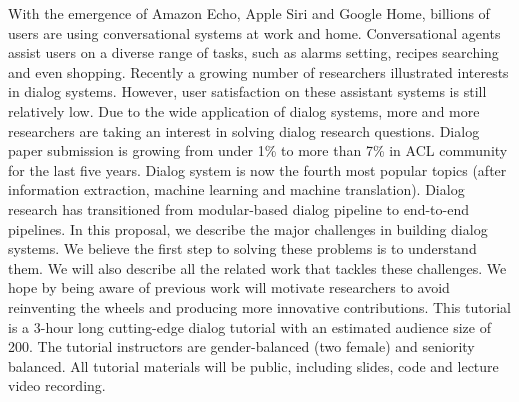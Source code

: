 With the emergence of Amazon Echo, Apple Siri and Google Home, billions of users are using conversational systems at work and home. Conversational agents assist users on a diverse range of tasks, such as alarms setting, recipes searching and even shopping. Recently a growing number of researchers illustrated interests in dialog systems. However, user satisfaction on these assistant systems is still relatively low. Due to the wide application of dialog systems, more and more researchers are taking an interest in solving dialog research questions. Dialog paper submission is growing from under 1\% to more than 7\% in ACL community for the last five years. Dialog system is now the fourth most popular topics (after information extraction, machine learning and machine translation). Dialog research has transitioned from modular-based dialog pipeline to end-to-end pipelines. In this proposal, we describe the major challenges in building dialog systems. We believe the first step to solving these problems is to understand them. We will also describe all the related work that tackles these challenges. We hope by being aware of previous work will motivate researchers to avoid reinventing the wheels and producing more innovative contributions. This tutorial is a 3-hour long cutting-edge dialog tutorial with an estimated audience size of 200. The tutorial instructors are gender-balanced (two female) and seniority balanced. All tutorial materials will be public, including slides, code and lecture video recording.
